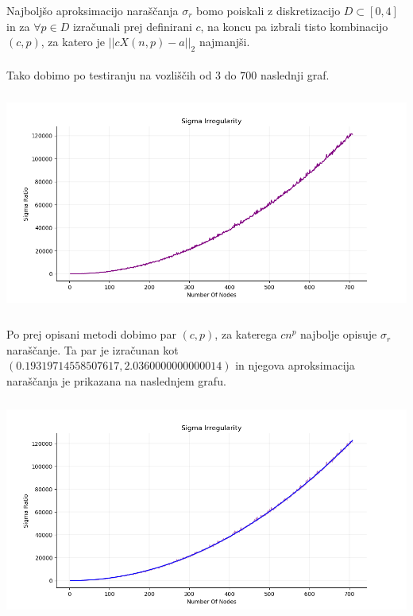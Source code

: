 \documentclass[ letterpaper, titlepage, fleqn]{article}
\begin{document}
Najboljšo aproksimacijo naraščanja $\sigma_r$ bomo poiskali 
z diskretizacijo $D \subset [0, 4]$ in za $\forall p \in D$ 
izračunali prej definirani $c$, na koncu pa izbrali tisto kombinacijo
$(c, p)$, za katero je $||cX(n, p) - a||_{2}$ najmanjši.
\\\\
Tako dobimo po testiranju na vozliščih od $3$ do $700$ naslednji graf.\\
\includegraphics[width=\textwidth, height=8cm]{raw_graph.png} \\
Po prej opisani metodi dobimo par $(c, p)$, za katerega $cn^p$ najbolje opisuje
$\sigma_r$ naraščanje. Ta par je izračunan kot $(0.19319714558507617, 2.0360000000000014)$ in
njegova aproksimacija naraščanja je prikazana na naslednjem grafu.\\
\includegraphics[width=\textwidth, height=8cm]{aproximation_graph.png}\\
\end{document}
